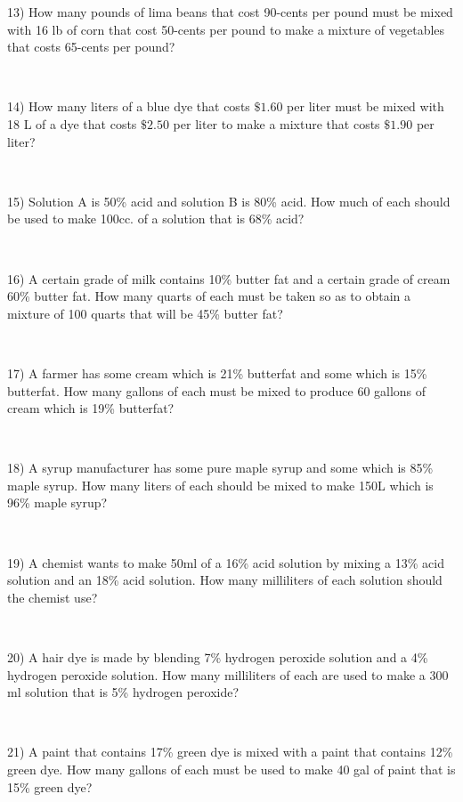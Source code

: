 13) How many pounds of lima beans that cost 90-cents per pound must be
mixed with  16 lb of corn that cost 50-cents per pound to make
a mixture of vegetables that costs 65-cents per
pound?\par
~\par

14) How many liters of a blue dye that costs $\$1.60$ per liter must
be mixed with 18 L of a dye that costs $\$2.50$ per
liter to make a mixture that costs $\$1.90$ per liter?\par
~\par

15) Solution A is 50\% acid and solution B is 80\% acid. How much of each
should be used to make 100cc. of a solution that is 68\% acid?\par
~\par

16) A certain grade of milk contains 10\% butter fat and a certain grade of
cream 60\% butter fat. How many quarts of each must be taken so
as to obtain a mixture of 100 quarts that will be 45\%
butter fat?\par
~\par

17) A farmer has some cream which is 21\% butterfat and some which is 15\% butterfat. How many gallons of each must be mixed to
produce 60 gallons of cream which is 19\% butterfat?\par
~\par

18) A syrup manufacturer has some pure maple syrup and some which is 85\% maple syrup. How many liters of each should be mixed to make
150L which  is 96\% maple syrup?\par
~\par

19) A chemist wants to make 50ml of a 16\% acid solution by mixing a 13\% acid solution and an 18\% acid solution. How many milliliters of
each solution should the chemist use?\par
~\par

20) A hair dye is made by blending 7\% hydrogen peroxide solution and a 4\% hydrogen peroxide solution. How many milliliters of each
are used to make a 300 ml solution that is 5\% hydrogen
peroxide?\par
~\par

21) A paint that contains 17\% green dye is mixed with a paint that contains
12\%  green dye. How many gallons of each must be used to make 40
gal of paint that is 15\% green dye?\par
~\par

